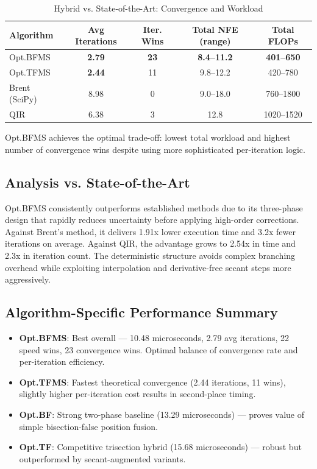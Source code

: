 \documentclass[amsmath, amssymb, aps]{revtex4-2}
\begin{document}
\begin{table}[H]
\centering
\caption{Hybrid vs. State-of-the-Art: Convergence and Workload}
\label{tab:state_of_art_workload}
\begin{tabular}{lcccc}
\hline
Algorithm & Avg Iterations & Iter. Wins & Total NFE (range) & Total FLOPs \\
\hline
Opt.BFMS         & \textbf{2.79} & \textbf{23} & \textbf{8.4–11.2} & \textbf{401–650} \\
Opt.TFMS         & \textbf{2.44} & 11 & 9.8–12.2 & 420–780 \\
Brent (SciPy)    & 8.98  & 0  & 9.0–18.0 & 760–1800 \\
QIR              & 6.38  & 3  & 12.8     & 1020–1520 \\
\hline
\end{tabular}
\end{table}
\FloatBarrier

Opt.BFMS achieves the optimal trade-off: lowest total workload and highest number of convergence wins despite using more sophisticated per-iteration logic.

\subsection{Analysis vs. State-of-the-Art}

Opt.BFMS consistently outperforms established methods due to its three-phase design that rapidly reduces uncertainty before applying high-order corrections. Against Brent’s method, it delivers 1.91x lower execution time and 3.2x fewer iterations on average. Against QIR, the advantage grows to 2.54x in time and 2.3x in iteration count. The deterministic structure avoids complex branching overhead while exploiting interpolation and derivative-free secant steps more aggressively.

\subsection{Algorithm-Specific Performance Summary}

\begin{itemize}
    \item \textbf{Opt.BFMS}: Best overall — 10.48 microseconds, 2.79 avg iterations, 22 speed wins, 23 convergence wins. Optimal balance of convergence rate and per-iteration efficiency.
    \item \textbf{Opt.TFMS}: Fastest theoretical convergence (2.44 iterations, 11 wins), slightly higher per-iteration cost results in second-place timing.
    \item \textbf{Opt.BF}: Strong two-phase baseline (13.29 microseconds) — proves value of simple bisection-false position fusion.
    \item \textbf{Opt.TF}: Competitive trisection hybrid (15.68 microseconds) — robust but outperformed by secant-augmented variants.
\end{itemize}
\FloatBarrier
\end{document}
